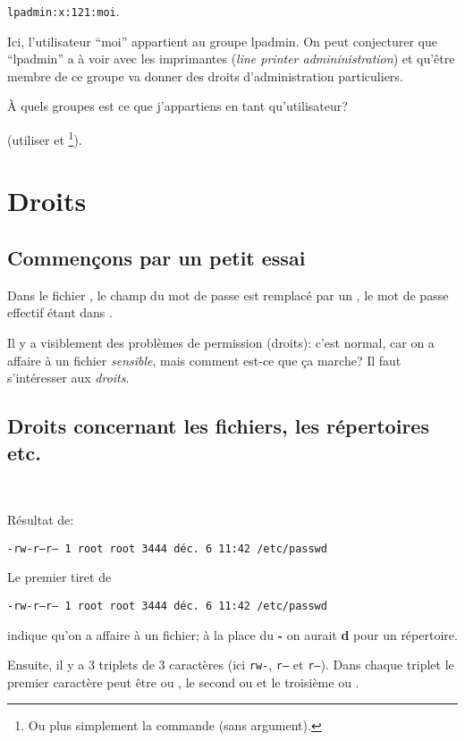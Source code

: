 \texttt{lpadmin:x:121:moi}.

Ici, l'utilisateur ``moi''
appartient au groupe lpadmin. On peut conjecturer que ``lpadmin'' a à
voir avec les imprimantes (\textsl{line printer admininistration}) et
qu'être membre de ce groupe va donner des 
droits d'administration particuliers.



\exo{}
\`A quels groupes est ce que j'appartiens en tant qu'utilisateur?

(utiliser  et \footnote{Ou plus simplement
  la commande  (sans argument).}).
\section{Droits}
\subsection{Commençons par un petit essai}
Dans le fichier , le champ du mot de passe est
remplacé par un , le mot de passe effectif étant dans
.

\smallskip

Il y a visiblement des problèmes de permission (droits): c'est normal,
car on a affaire à un fichier \textsl{sensible},
mais comment est-ce que ça marche? Il faut s'intéresser aux \emph{droits}.
\subsection{Droits concernant les fichiers, les répertoires etc.}~


Résultat de:


\begin{center}
\large\texttt{-rw-r---r--- 1 root root 3444 déc. 6 11:42 /etc/passwd}
\end{center}

Le premier tiret de


\begin{center}
\texttt{-rw-r---r--- 1 root root 3444
  déc. 6 11:42 /etc/passwd}
\end{center}

indique qu'on a affaire à un fichier;
  à la place du \textbf{-} on aurait \textbf{d} pour un
  répertoire.


Ensuite, il y a 3 triplets de 3 caractères (ici \texttt{rw-},
\texttt{r---} et \texttt{r---}).
Dans chaque triplet le
premier caractère peut être  ou \ttt{-}, le second   ou \ttt{-} et
le troisième  ou \ttt{-}.

